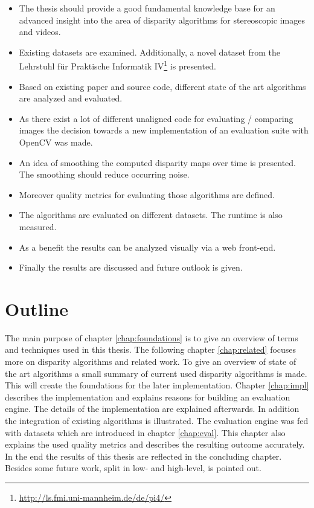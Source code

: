 \begin{itemize}
	\item The thesis should provide a good fundamental knowledge base for an advanced insight into the area of disparity algorithms for stereoscopic images and videos.
	\item Existing datasets are examined. Additionally, a novel dataset from the Lehrstuhl f{\"u}r Praktische Informatik IV\footnote{\url{http://ls.fmi.uni-mannheim.de/de/pi4/}} is presented.
	\item Based on existing paper and source code, different state of the art algorithms are analyzed and evaluated.
	\item As there exist a lot of different unaligned code for evaluating / comparing images the decision towards a new implementation of an evaluation suite with OpenCV was made.
	\item An idea of smoothing the computed disparity maps over time is presented. The smoothing should reduce occurring noise.
	\item Moreover quality metrics for evaluating those algorithms are defined.
	\item The algorithms are evaluated on different datasets. The runtime is also measured.
	\item As a benefit the results can be analyzed visually via a web front-end.
	\item Finally the results are discussed and future outlook is given.
\end{itemize}

\section{Outline}

The main purpose of chapter \ref{chap:foundations} is to give an overview of terms and techniques used in this thesis.
The following chapter \ref{chap:related} focuses more on disparity algorithms and related work.
To give an overview of state of the art algorithms a small summary of current used disparity algorithms is made.
This will create the foundations for the later implementation.
Chapter \ref{chap:impl} describes the implementation and explains reasons for building an evaluation engine.
The details of the implementation are explained afterwards.
In addition the integration of existing algorithms is illustrated.
The evaluation engine was fed with datasets which are introduced in chapter \ref{chap:eval}.
This chapter also explains the used quality metrics and describes the resulting outcome accurately.
In the end the results of this thesis are reflected in the concluding chapter.
Besides some future work, split in low- and high-level, is pointed out.

